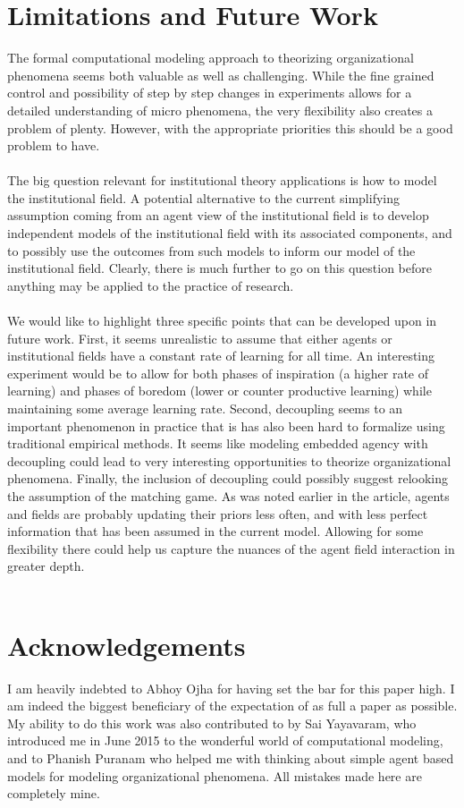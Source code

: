 \documentclass[12pt]{article}
\begin{document}
\section{Limitations and Future Work}
\noindent The formal computational modeling approach to theorizing organizational phenomena seems both valuable as well as challenging. While the fine grained control and possibility of step by step changes in experiments allows for a detailed understanding of micro phenomena, the very flexibility also creates a problem of plenty. However, with the appropriate priorities this should be a good problem to have.\\\\
The big question relevant for institutional theory applications is how to model the institutional field. A potential alternative to the current simplifying assumption coming from an agent view of the institutional field is to develop independent models of the institutional field with its associated components, and to possibly use the outcomes from such models to inform our model of the institutional field. Clearly, there is much further to go on this question before anything may be applied to the practice of research.\\\\
We would like to highlight three specific points that can be developed upon in future work. First, it seems unrealistic to assume that either agents or institutional fields have a constant rate of learning for all time. An interesting experiment would be to allow for both phases of inspiration (a higher rate of learning) and phases of boredom (lower or counter productive learning) while maintaining some average learning rate. Second, decoupling seems to an important phenomenon in practice that is has also been hard to formalize using traditional empirical methods. It seems like modeling embedded agency with decoupling could lead to very interesting opportunities to theorize organizational phenomena. Finally, the inclusion of decoupling could possibly suggest relooking the assumption of the matching game. As was noted earlier in the article, agents and fields are probably updating their priors less often, and with less perfect information that has been assumed in the current model. Allowing for some flexibility there could help us capture the nuances of the agent field interaction in greater depth.\\\\

\section{Acknowledgements}
I am heavily indebted to Abhoy Ojha for having set the bar for this paper high. I am indeed the biggest beneficiary of the expectation of as full a paper as possible. My ability to do this work was also contributed to by Sai Yayavaram, who introduced me in June 2015 to the wonderful world of computational modeling, and to Phanish Puranam who helped me with thinking about simple agent based models for modeling organizational phenomena. All mistakes made here are completely mine.
\end{document}
